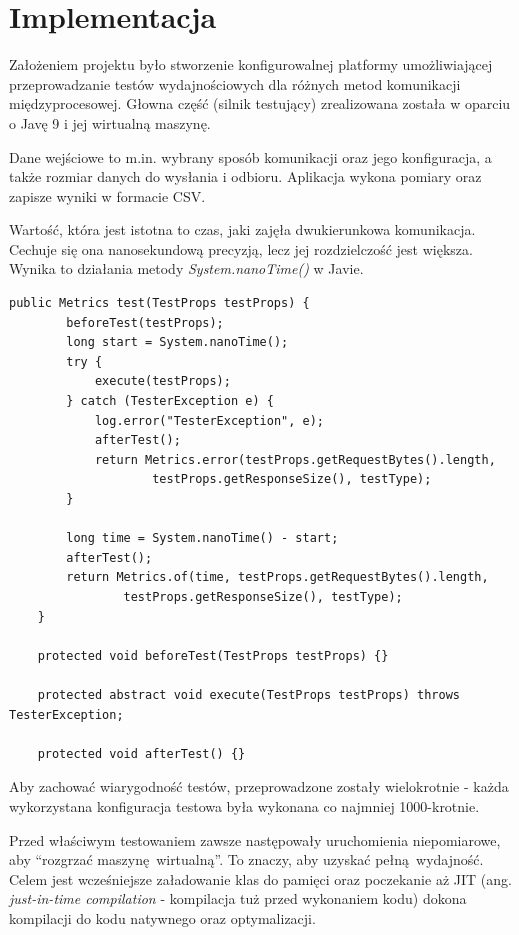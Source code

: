 \chapter{Implementacja}

Założeniem projektu było stworzenie konfigurowalnej platformy umożliwiającej przeprowadzanie testów wydajnościowych dla różnych metod komunikacji międzyprocesowej. Głowna część (silnik testujący) zrealizowana została w oparciu o Javę 9 i jej wirtualną maszynę.

Dane wejściowe to m.in. wybrany sposób komunikacji oraz jego konfiguracja, a także rozmiar danych do wysłania i odbioru. Aplikacja wykona pomiary oraz zapisze wyniki w formacie CSV.

Wartość, która jest istotna to czas, jaki zajęła dwukierunkowa komunikacja. Cechuje się ona nanosekundową precyzją, lecz jej rozdzielczość jest większa. Wynika to działania metody \textit{System.nanoTime()} w Javie.

\begin{lstlisting}[caption={Metoda klasy abstrakcyjnej AbstractTransferTester, która jest wykorzystywana przez wszystkie sposoby komunikacji do wykonania pomiarów (implementowane/przeciążane są ostatnie 3 metody).},captionpos=b]
    public Metrics test(TestProps testProps) {
        beforeTest(testProps);
        long start = System.nanoTime();
        try {
            execute(testProps);
        } catch (TesterException e) {
            log.error("TesterException", e);
            afterTest();
            return Metrics.error(testProps.getRequestBytes().length,
                    testProps.getResponseSize(), testType);
        }

        long time = System.nanoTime() - start;
        afterTest();
        return Metrics.of(time, testProps.getRequestBytes().length,
                testProps.getResponseSize(), testType);
    }

    protected void beforeTest(TestProps testProps) {}

    protected abstract void execute(TestProps testProps) throws TesterException;

    protected void afterTest() {}
\end{lstlisting}


Aby zachować wiarygodność testów, przeprowadzone zostały wielokrotnie - każda wykorzystana konfiguracja testowa była wykonana co najmniej 1000-krotnie.

Przed właściwym testowaniem zawsze następowały uruchomienia niepomiarowe, aby \enquote{rozgrzać maszynę wirtualną}. To znaczy, aby uzyskać pełną wydajność. Celem jest wcześniejsze załadowanie klas do pamięci oraz poczekanie aż JIT (ang. \textit{just-in-time compilation} - kompilacja tuż przed wykonaniem kodu) dokona kompilacji do kodu natywnego oraz optymalizacji.

